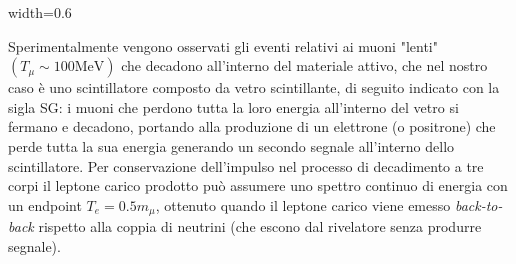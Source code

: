 \documentclass[a4paper, 11pt]{article}
\begin{document}
    \vspace{20pt}
    \begin{center}
    \begin{adjustbox}{width=0.6\textwidth}
    \end{adjustbox}
    \end{center}
    
    \vspace{20pt}
    Sperimentalmente vengono osservati gli eventi relativi ai muoni "lenti" $\left(T_\mu\sim100\unit{\mega\electronvolt}\right)$ che decadono all'interno del materiale attivo, che nel nostro caso è uno scintillatore composto da vetro scintillante, di seguito indicato con la sigla SG: i muoni che perdono tutta la loro energia all'interno del vetro si fermano e decadono, portando alla produzione di un elettrone (o positrone) che perde tutta la sua energia generando un secondo segnale all'interno dello scintillatore. Per conservazione dell'impulso nel processo di decadimento a tre corpi il leptone carico prodotto può assumere uno spettro continuo di energia con un endpoint $T_e=0.5m_\mu$, ottenuto quando il leptone carico viene emesso \textit{back-to-back} rispetto alla coppia di neutrini (che escono dal rivelatore senza produrre segnale).
\end{document}
